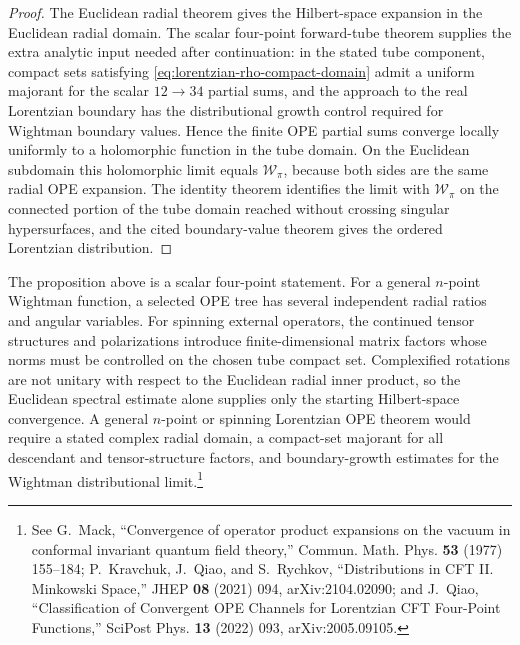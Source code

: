 \begin{proof}
The Euclidean radial theorem gives the Hilbert-space expansion in the Euclidean
radial domain.  The scalar four-point forward-tube theorem supplies the extra
analytic input needed after continuation: in the stated tube component, compact
sets satisfying \eqref{eq:lorentzian-rho-compact-domain} admit a uniform
majorant for the scalar \(12\to34\) partial sums, and the approach to the real
Lorentzian boundary has the distributional growth control required for
Wightman boundary values.  Hence the finite OPE partial sums converge locally
uniformly to a holomorphic function in the tube domain.  On the Euclidean
subdomain this holomorphic limit equals \(\mathcal W_\pi\), because both sides
are the same radial OPE expansion.  The identity theorem identifies the limit
with \(\mathcal W_\pi\) on the connected portion of the tube domain reached
without crossing singular hypersurfaces, and the cited boundary-value theorem
gives the ordered Lorentzian distribution.
\end{proof}

\begin{controlledapproximation}
\label{ca:lorentzian-ope-beyond-scalar-four-point}
The proposition above is a scalar four-point statement.  For a general
\(n\)-point Wightman function, a selected OPE tree has several independent
radial ratios and angular variables.  For spinning external operators, the
continued tensor structures and polarizations introduce finite-dimensional
matrix factors whose norms must be controlled on the chosen tube compact set.
Complexified rotations are not unitary with respect to the Euclidean radial
inner product, so the Euclidean spectral estimate alone supplies only the
starting Hilbert-space convergence.  A general \(n\)-point or spinning
Lorentzian OPE theorem would require a stated complex radial domain, a
compact-set majorant for all descendant and tensor-structure factors, and
boundary-growth estimates for the Wightman distributional limit.\footnote{See
G.~Mack, ``Convergence of operator product expansions on the vacuum in
conformal invariant quantum field theory,'' Commun. Math. Phys. \textbf{53}
(1977) 155--184; P.~Kravchuk, J.~Qiao, and S.~Rychkov, ``Distributions in CFT
II. Minkowski Space,'' JHEP \textbf{08} (2021) 094, arXiv:2104.02090; and
J.~Qiao, ``Classification of Convergent OPE Channels for Lorentzian CFT
Four-Point Functions,'' SciPost Phys. \textbf{13} (2022) 093,
arXiv:2005.09105.}
\end{controlledapproximation}

